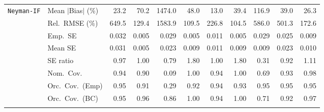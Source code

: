 \begin{landscape}
\begin{longtable}{llrrrrrrrrr}
\addlinespace[2pt]
\quad \texttt{Neyman-IF} & Mean $|$Bias$|$ (\%) & \cellcolor{ranktwo}23.2 & 70.2 & 1474.0 & 48.0 & \cellcolor{rankone}13.0 & 39.4 & 116.9 & 39.0 & \cellcolor{rankthree}26.3 \\
 & Rel.\ RMSE (\%) & 649.5 & \cellcolor{rankthree}129.4 & 1583.9 & \cellcolor{ranktwo}109.5 & 226.8 & \cellcolor{rankone}104.5 & 586.0 & 501.3 & 172.6 \\
 & Emp.\ SE & 0.032 & 0.005 & 0.029 & 0.005 & 0.011 & 0.005 & 0.029 & 0.025 & 0.009 \\
 & Mean SE & 0.031 & 0.005 & 0.023 & 0.009 & 0.011 & 0.009 & 0.009 & 0.023 & 0.010 \\
 & SE ratio & \cellcolor{ranktwo}0.97 & \cellcolor{rankone}1.00 & 0.79 & 1.80 & \cellcolor{rankone}1.00 & 1.80 & 0.31 & \cellcolor{rankthree}0.92 & 1.11 \\
 & Nom.\ Cov. & \cellcolor{rankone}0.94 & 0.90 & 0.09 & 1.00 & \cellcolor{rankone}0.94 & 1.00 & 0.69 & \cellcolor{ranktwo}0.93 & \cellcolor{rankthree}0.98 \\
 & Orc.\ Cov.\ (Emp) & \cellcolor{rankone}0.95 & 0.91 & 0.29 & 0.92 & \cellcolor{ranktwo}0.94 & \cellcolor{rankthree}0.93 & \cellcolor{rankone}0.95 & \cellcolor{rankone}0.95 & \cellcolor{rankone}0.95 \\
 & Orc.\ Cov.\ (BC) & \cellcolor{rankone}0.95 & \cellcolor{ranktwo}0.96 & 0.86 & 1.00 & \cellcolor{ranktwo}0.94 & 1.00 & 0.71 & 0.92 & \cellcolor{rankthree}0.97 \\
\addlinespace[2pt]
\end{longtable}
\end{landscape}
